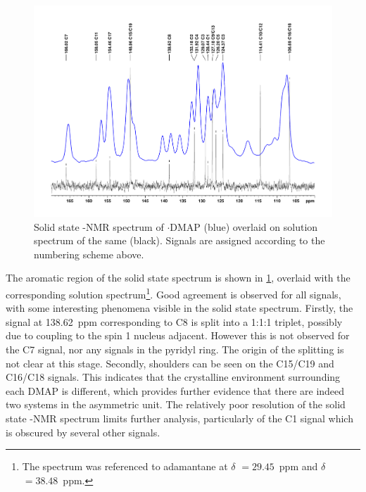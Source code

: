 \begin{refsection}
\begin{figure}
  \includegraphics[width=\linewidth]{Figures/ebs-4ome-dmap-cpmas-sol-13c.pdf}
  \caption[Solid state -NMR spectrum of $ \cdot $DMAP.]{Solid state -NMR spectrum of $ \cdot $DMAP (blue) overlaid on solution spectrum of the same (black). Signals are assigned according to the numbering scheme above.}\label{fig:cpmas-sol-13c}
\end{figure}

The aromatic region of the solid state  spectrum is shown in \cref{fig:cpmas-sol-13c}, overlaid with the corresponding solution spectrum\footnote{The  spectrum was referenced to adamantane at $ \delta $ $= 29.45$~ppm and $ \delta $ $= 38.48$~ppm.\autocite{Morcombe2003}}.
Good agreement is observed for all signals, with some interesting phenomena visible in the solid state spectrum.
Firstly, the signal at 138.62~ppm corresponding to C8 is split into a 1:1:1 triplet, possibly due to coupling to the spin 1  nucleus adjacent.
However this is not observed for the C7 signal, nor any signals in the pyridyl ring.
The origin of the splitting is not clear at this stage.
Secondly, shoulders can be seen on the C15/C19 and C16/C18 signals.
This indicates that the crystalline environment surrounding each DMAP is different, which provides further evidence that there are indeed two systems in the asymmetric unit.
The relatively poor resolution of the solid state -NMR spectrum limits further analysis, particularly of the C1 signal which is obscured by several other signals.


\end{refsection}
